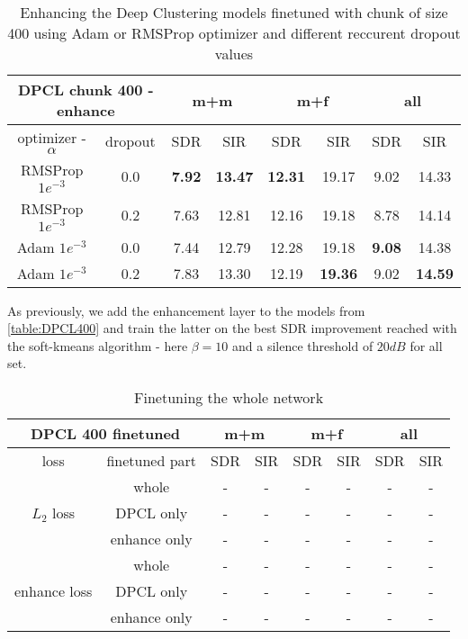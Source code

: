 \documentclass[master,final,11pt]{iscs-thesis}
\begin{document}
\begin{table}[h]
\centering
\begin{tabular}{c|c|c|c|c|c|c|c}
\multicolumn{2}{c|}{DPCL chunk 400 - enhance} & \multicolumn{2}{c|}{m+m} & \multicolumn{2}{c|}{m+f} & \multicolumn{2}{c}{all} \\ 
\hline 
optimizer - $\alpha$ & dropout & SDR & SIR & SDR & SIR & SDR & SIR \\ 
\hline 
RMSProp $1e^{-3}$ & 0.0 & \textbf{7.92} & \textbf{13.47} & \textbf{12.31} & 19.17 & 9.02 & 14.33 \\ 
RMSProp $1e^{-3}$ & 0.2 & 7.63 & 12.81 & 12.16 & 19.18 & 8.78 & 14.14 \\ 
Adam $1e^{-3}$ & 0.0 & 7.44 & 12.79 & 12.28 & 19.18 & \textbf{9.08} & 14.38 \\
Adam $1e^{-3}$ & 0.2 & 7.83 & 13.30 & 12.19 & \textbf{19.36} & 9.02 & \textbf{14.59}\\ 
\end{tabular}
\captionsetup{justification=centering}
\caption{Enhancing the Deep Clustering models finetuned with chunk of size 400 using Adam or RMSProp optimizer and different reccurent dropout values}
\label{table:DPCL400enh}
\end{table}

As previously, we add the enhancement layer to the models from \ref{table:DPCL400} and train the latter on the best SDR improvement reached with the soft-kmeans algorithm - here $\beta = 10$ and a silence threshold of $20dB$ for all set. 

\begin{table}[h]
\centering
\begin{tabular}{c|c|c|c|c|c|c|c}
\multicolumn{2}{c|}{DPCL 400 finetuned} & \multicolumn{2}{c|}{m+m} & \multicolumn{2}{c|}{m+f} & \multicolumn{2}{c}{all} \\ 
\hline 
 loss & finetuned part & SDR & SIR & SDR & SIR & SDR & SIR \\ 
\hline 
\multirow{3}{*}{$L_2$ loss} & whole & - & - & - & - & - & - \\ 
\cline{2-8} 
 & DPCL only & - & - & - & - & - & - \\ 
\cline{2-8} 
 & enhance only & - & - & - & - & - & - \\ 
\hline
\multirow{3}{*}{enhance loss} & whole & - & - & - & - & - & - \\ 
\cline{2-8} 
 & DPCL only & - & - & - & - & - & - \\ 
\cline{2-8}
 & enhance only & - & - & - & - & - & - \\ 
\hline 
\end{tabular}
\captionsetup{justification=centering}
\caption{Finetuning the whole network}
\label{table:DPCL400fine}
\end{table}
\end{document}
